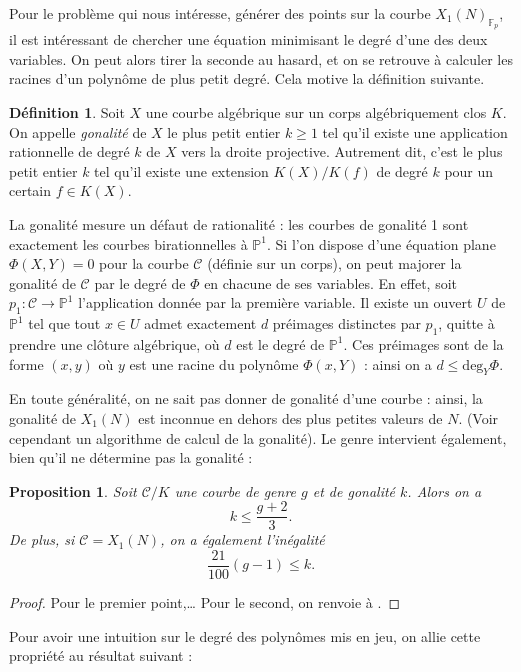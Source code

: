 \documentclass[11pt,a4paper]{article}
\newcommand{\F}{\mathbb{F}}
\renewcommand{\P}{\mathbb{P}}
\newcommand{\Cl}{\mathcal{C}}
\newcommand{\vers}{\longrightarrow}
\newtheorem*{prop}{Proposition}
\theoremstyle{definition}
\newtheorem*{defi}{Définition}
\begin{document}
Pour le problème qui nous intéresse, générer des points sur la courbe $X_1(N)_{\F_p}$, il est intéressant de chercher une équation minimisant le degré d'une des deux variables. On peut alors tirer la seconde au hasard, et on se retrouve à calculer les racines d'un polynôme de plus petit degré. Cela motive la définition suivante.

\begin{defi}
Soit $X$ une courbe algébrique sur un corps algébriquement clos $K$. On appelle \emph{gonalité} de $X$ le plus petit entier $k\geq 1$ tel qu'il existe une application rationnelle de degré $k$ de $X$ vers la droite projective. Autrement dit, c'est le plus petit entier $k$ tel qu'il existe une extension $K(X)/K(f)$ de degré $k$ pour un certain $f\in K(X)$.
\end{defi}

La gonalité mesure un défaut de rationalité : les courbes de gonalité 1 sont exactement les courbes birationnelles à $\P^1$.
Si l'on dispose d'une équation plane $\Phi(X, Y) = 0$ pour la courbe $\Cl$ (définie sur un corps), on peut majorer la gonalité de $\Cl$ par le degré de $\Phi$ en chacune de ses variables. En effet, soit $p_1 : \Cl\vers \P^1$ l'application donnée par la première variable. Il existe un ouvert $U$ de $\P^1$ tel que tout $x\in U$ admet exactement $d$ préimages distinctes par $p_1$, quitte à prendre une clôture algébrique, où $d$ est le degré de $\P^1$. Ces préimages sont de la forme $(x, y)$ où $y$ est une racine du polynôme $\Phi(x, Y)$ : ainsi on a $d \leq \mathrm{deg}_Y \Phi$.

En toute généralité, on ne sait pas donner de gonalité d'une courbe : ainsi, la gonalité de $X_1(N)$ est inconnue en dehors des plus petites valeurs de $N$. (Voir cependant un algorithme de calcul de la gonalité). Le genre intervient également, bien qu'il ne détermine pas la gonalité :

\begin{prop}
Soit $\Cl/K$ une courbe de genre $g$ et de gonalité $k$. Alors on a
$$k\leq \frac{g+2}{3}.$$
De plus, si $\Cl = X_1(N)$, on a également l'inégalité
$$\frac{21}{100}(g-1)\leq k.$$
\end{prop}

\begin{proof} Pour le premier point,\ldots
Pour le second, on renvoie à \cite{gon}.
\end{proof}


Pour avoir une intuition sur le degré des polynômes mis en jeu, on allie cette propriété au résultat suivant :
\end{document}
